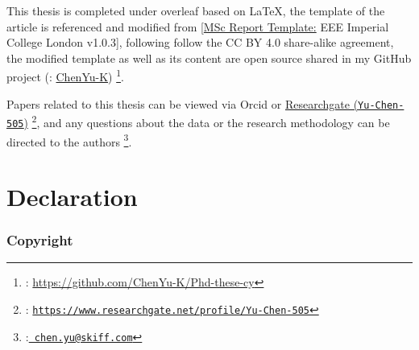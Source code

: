 This thesis is completed under overleaf based on \LaTeX, the template of the article is referenced and modified from [\hyperlink{https://www.overleaf.com/latex/templates/msc-report-template-eee-imperial-college-london-v1-dot-0-3/qtkpngktpwpw}{MSc Report Template:} EEE Imperial College London v1.0.3], following follow the CC BY 4.0 share-alike agreement, the modified template as well as its content are open source shared in my GitHub project (\faGithub : \hyperlink{https://github.com/ChenYu-K/Phd-these-cy}{ChenYu-K}) \footnote{\faGithub : \url{https://github.com/ChenYu-K/Phd-these-cy}}.

Papers related to this thesis can be viewed via Orcid  or \hyperlink{https://www.researchgate.net/profile/Yu-Chen-505}{Researchgate (\texttt{Yu-Chen-505})} \footnote{\aiResearchGate: {\href{https://www.researchgate.net/profile/Yu-Chen-505}{\texttt{https://www.researchgate.net/profile/Yu-Chen-505}}}}, and any questions about the data or the research methodology can be directed to the authors \footnote{\faEnvelope:{\href{mailto:chen.yu@skiff.com}{\texttt{ chen.yu@skiff.com}}}}.






\cleardoublepage{}
{}\mtcaddchapter 
\chapter*{Declaration}
\addtocounter{counter}{-1}


\subsection*{Copyright}

